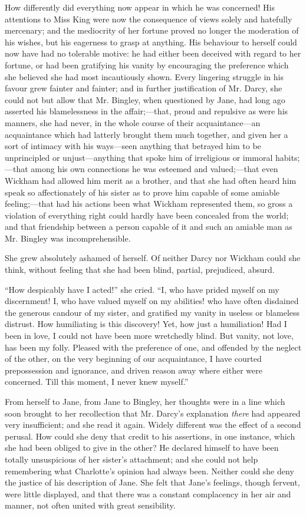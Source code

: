 \documentclass[12pt]{book}
\begin{document}
How differently did everything now appear in which he was concerned! His attentions to Miss King were now the consequence of views solely and hatefully mercenary; and the mediocrity of her fortune proved no longer the moderation of his wishes, but his eagerness to grasp at anything. His behaviour to herself could now have had no tolerable motive: he had either been deceived with regard to her fortune, or had been gratifying his vanity by encouraging the preference which she believed she had most incautiously shown. Every lingering struggle in his favour grew fainter and fainter; and in further justification of Mr. Darcy, she could not but allow that Mr. Bingley, when questioned by Jane, had long ago asserted his blamelessness in the affair;---that, proud and repulsive as were his manners, she had never, in the whole course of their acquaintance---an acquaintance which had latterly brought them much together, and given her a sort of intimacy with his ways---seen anything that betrayed him to be unprincipled or unjust---anything that spoke him of irreligious or immoral habits;---that among his own connections he was esteemed and valued;---that even Wickham had allowed him merit as a brother, and that she had often heard him speak so affectionately of his sister as to prove him capable of some amiable feeling;---that had his actions been what Wickham represented them, so gross a violation of everything right could hardly have been concealed from the world; and that friendship between a person capable of it and such an amiable man as Mr. Bingley was incomprehensible.

She grew absolutely ashamed of herself. Of neither Darcy nor Wickham could she think, without feeling that she had been blind, partial, prejudiced, absurd.

``How despicably have I acted!'' she cried. ``I, who have prided myself on my discernment! I, who have valued myself on my abilities! who have often disdained the generous candour of my sister, and gratified my vanity in useless or blameless distrust. How humiliating is this discovery! Yet, how just a humiliation! Had I been in love, I could not have been more wretchedly blind. But vanity, not love, has been my folly. Pleased with the preference of one, and offended by the neglect of the other, on the very beginning of our acquaintance, I have courted prepossession and ignorance, and driven reason away where either were concerned. Till this moment, I never knew myself.''

From herself to Jane, from Jane to Bingley, her thoughts were in a line which soon brought to her recollection that Mr. Darcy's explanation \textit{there} had appeared very insufficient; and she read it again. Widely different was the effect of a second perusal. How could she deny that credit to his assertions, in one instance, which she had been obliged to give in the other? He declared himself to have been totally unsuspicious of her sister's attachment; and she could not help remembering what Charlotte's opinion had always been. Neither could she deny the justice of his description of Jane. She felt that Jane's feelings, though fervent, were little displayed, and that there was a constant complacency in her air and manner, not often united with great sensibility.
\end{document}
